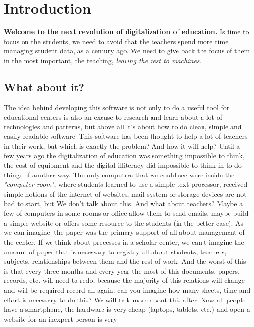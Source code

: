 \chapter{Introduction}

\textbf{Welcome to the next revolution of digitalization of education.}
\intro
Is time to focus on the students, we need to avoid that the teachers spend more
time managing student data, as a century ago. We need to give back the focus of them
in the most important, the teaching, \textit{leaving the rest to machines.}


\section{What about it?}

The idea behind developing this software is not only to do a
useful tool for educational centers is also an excuse to research and
learn about a lot of technologies and patterns, but above all it's
about how to do clean, simple and easily readable software.
\intro
This software has been thought to help a lot of teachers in their work, but which
is exactly the problem? And how it will help?
\intro
Until a few years ago the digitalization of education was something
impossible to think, the cost of equipment and the digital illiteracy did impossible
to think in to do things of another way. The only computers
that we could see were inside the \textit{"computer room"}, where students learned
to use a simple text processor, received simple notions of the internet
of websites, mail system or storage devices are not bad to start, but
We don't talk about this. And what about teachers? Maybe a few of
computers in some rooms or office allow them to send emails, maybe build
a simple website or offers some resource to the students (in the better case).
As we can imagine, the paper was the primary support of all
about management of the center.
\intro
If we think about processes in a scholar center, we can't imagine
the amount of paper that is necessary to registry all about students,
teachers, subjects, relationships between them and the rest of work.
And the worst of this is that every three months and every year the
most of this documents, papers, records, etc. will need to redo, because
the majority of this relations will change and will be required record
all again.
\intro
can you imagine how many sheets, time and effort is necessary
to do this? We will talk more about this after.
\intro
Now all people have a smartphone,  the hardware is very cheap (laptops,
tablets, etc.) and open a website for an inexpert person is very
